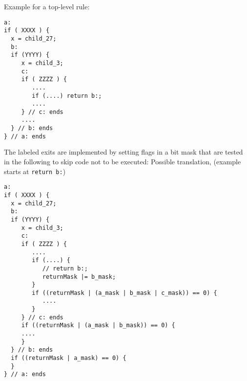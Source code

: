Example for a top-level rule:

\begin{verbatim}
a:
if ( XXXX ) {
  x = child_27;
  b:
  if (YYYY) {
     x = child_3;
     c:
     if ( ZZZZ ) {
        ....
        if (....) return b:;
        ....
     } // c: ends
     ....
  } // b: ends
} // a: ends
\end{verbatim}

The labeled exits are implemented by setting flags in a bit mask that are
tested in the following to skip code not to be executed:
\newpage
Possible translation, (example starts at \texttt{return b:})
\begin{verbatim}
a:
if ( XXXX ) {
  x = child_27;
  b:
  if (YYYY) {
     x = child_3;
     c:
     if ( ZZZZ ) {
        ....
        if (....) {
           // return b:;
           returnMask |= b_mask;
        }
        if ((returnMask | (a_mask | b_mask | c_mask)) == 0) {
           ....
        }
     } // c: ends
     if ((returnMask | (a_mask | b_mask)) == 0) {
     ....
     }
  } // b: ends
  if ((returnMask | a_mask) == 0) {
  }
} // a: ends
\end{verbatim}



